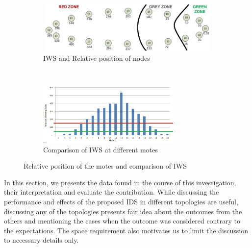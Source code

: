 \documentclass[conference]{IEEEtran}
\newcommand{\notedme}[1]{\raisebox{0pt}[0pt][0pt]{\pdfcomment[open=true,color=blue]{#1}}}
\begin{document}
\begin{figure}[t!]
    \centering
    \begin{subfigure}[b]{0.5\textwidth}
        \centering
        \includegraphics[height=1in, width=4in]{Elliptical}
        \caption{IWS and Relative position of nodes}
        \label{subfig:elliptopo} %
    \end{subfigure}%
    ~ 
    \begin{subfigure}[b]{0.5\textwidth}
        \centering
        \includegraphics[height=1.2in]{Elliptical_column}
        \caption{Comparison of IWS at different motes}
        \label{subfig:ellipgraph} %
    \end{subfigure}
    \caption{Relative position of the motes and comparison of IWS }
    \label{fig:ellip} %
\end{figure}

In this section, we presents the data found in the course of this investigation, their interpretation and evaluate the contribution.
While discussing the performance and effects of the proposed IDS in different topologies are useful, discussing any of the topologies presents fair idea about the outcomes from the others and mentioning the cases when the outcome was considered  contrary to the expectations.
The space requirement also motivates us to limit the discussion to necessary details only.


\end{document}
